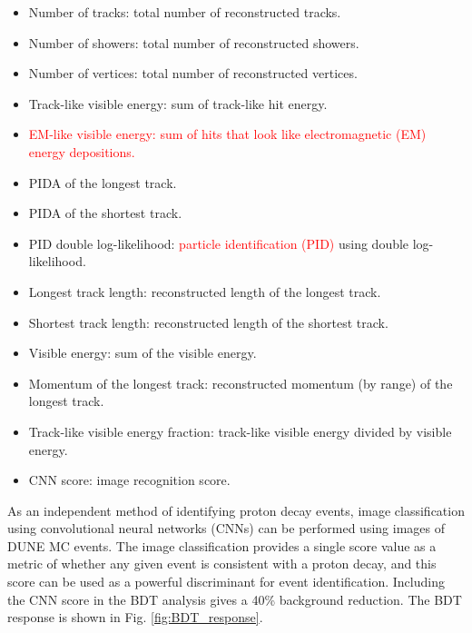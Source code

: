   \begin{itemize}
  \item Number of tracks: total number of reconstructed tracks. 
  \item Number of showers: total number of reconstructed showers.
  \item Number of vertices: total number of reconstructed vertices.
  \item Track-like visible energy: sum of track-like hit energy.
  \item \textcolor{red}{EM-like visible energy: sum of hits that look like electromagnetic (EM) energy depositions.}
  \item PIDA of the longest track.
  \item PIDA of the shortest track.
  \item PID double log-likelihood: \textcolor{red}{particle identification (PID)} using double log-likelihood. 
  \item Longest track length: reconstructed length of the longest track.
  \item Shortest track length: reconstructed length of the shortest track.
  \item Visible energy: sum of the visible energy.
  \item Momentum of the longest track: reconstructed momentum (by range) of the longest track.
  \item Track-like visible energy fraction: track-like visible energy divided by visible energy.
  \item CNN score: image recognition score.
  \end{itemize} 
As an independent method of identifying proton decay events, image classification using convolutional neural networks (CNNs) can be performed using \twod images %
of DUNE MC events. The image classification provides a single score value as a metric of whether any given event is consistent with a proton decay, and this score can be used as a powerful discriminant for event identification.  Including the CNN score in the BDT analysis gives a 40\% background reduction.
The BDT response is shown in Fig. \ref{fig:BDT_response}. 

